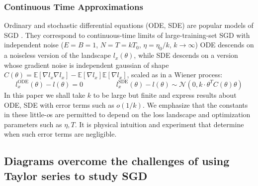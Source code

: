 \documentclass[anon,12pt]{colt2021} %
\newcommand{\expc}{\mathbb{E}}
\newcommand{\Nn}{\mathcal{N}}   \newcommand{\NN}{\mathbb{N}}
\begin{document}
            \subsubsection{Continuous Time Approximations}
                Ordinary and stochastic differential equations (ODE, SDE) are
                popular models of SGD \citep{li18, ba21}.  They correspond to
                continuous-time limits of large-training-set SGD with
                independent noise ($E=B=1$, $N=T=kT_0$, $\eta=\eta_0/k$, $k\to
                \infty$) ODE descends on a noiseless version of the landscape
                $l_x(\theta)$, while SDE descends on a version whose gradient
                noise is independent gaussian of shape $C(\theta) =
                \expc[\nabla l_x \nabla l_x] - \expc[\nabla l_x] \expc[\nabla
                l_x]$, scaled as in a Wiener process:
                $$
                    l^{\text{ODE}}_x(\theta) - l(\theta) = 0
                    \hspace{2cm}
                    l^{\text{SDE}}_x(\theta) - l(\theta)
                        \sim \Nn(0, k\cdot \theta^T C(\theta)\theta)
                $$
                In this paper we shall take $k$ to be large but finite and
                express results about ODE, SDE with error terms such as
                $o(1/k)$.  We emphasize that the constants in these little-$o$s
                are permitted to depend on the loss landscape and optimization
                parameters such as $\eta, T$.  It is physical intuition and
                experiment that determine when such error terms are negligible.

        \subsection{Diagrams overcome the challenges of using Taylor series to study SGD}\label{sect:using}\label{sect:diagrams}
\end{document}
